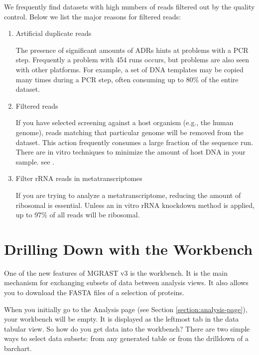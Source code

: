 \documentclass[12pt,fullpage]{report}
\begin{document}
We frequently find datasets with high numbers of reads filtered out by the quality control. Below we list the major reasons for filtered reads:

\begin{enumerate}
\item Artificial duplicate reads 

The presence of significant amounts of ADRs hints at problems with a PCR step. Frequently a problem with 454 runs occurs, but problems are also seen with other platforms. For example, a set of DNA templates may be  copied many times during a PCR step, often consuming up to 80\% of the entire dataset.

\item Filtered reads

If you have selected screening against a host organism (e.g., the human genome), reads matching that particular genome will be removed from the dataset. This action frequently consumes a large fraction of the sequence run. There are in vitro techniques to minimize the amount of host DNA in your sample. see \cite{THOMASREVIEW}.

\item Filter rRNA reads in metatranscriptomes

If you are trying to analyze a metatranscriptome, reducing the amount of ribosomal is essential. Unless an in vitro rRNA knockdown method is applied, up to 97\% of all reads will be ribosomal.
\end{enumerate}
\section{Drilling Down with the Workbench}

One of the new features of MGRAST v3 is the workbench. It is the main mechanism for exchanging subsets of data between analysis views. It also allows you to download the FASTA files of a selection of proteins.

When you initially go to the Analysis page (see Section \ref{section:analysis-page}), your workbench will be empty. It is displayed as the leftmost tab in the data tabular view. So how do you get data into the workbench? There are two simple ways to select data subsets: from any generated table or from the drilldown of a barchart.
\end{document}
